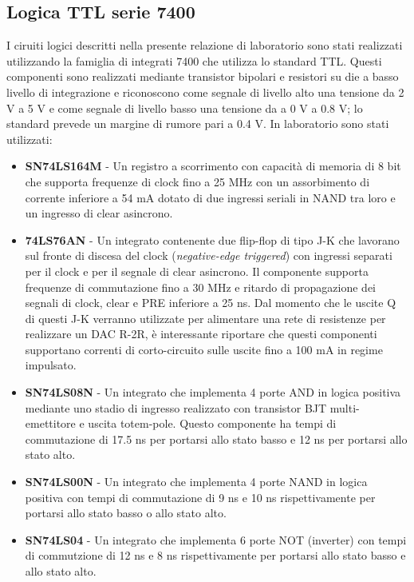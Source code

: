 \documentclass[journal]{IEEEtran}
\begin{document}
\subsection{Logica TTL serie 7400}
I ciruiti logici descritti nella presente relazione di laboratorio sono stati realizzati utilizzando la famiglia di integrati 7400 che utilizza lo standard TTL. Questi componenti sono realizzati mediante transistor bipolari e resistori su die a basso livello di integrazione e riconoscono come segnale di livello alto una tensione da 2 V a 5 V e come segnale di livello basso una tensione da a 0 V a 0.8 V; lo standard prevede un margine di rumore pari a 0.4 V. In laboratorio sono stati utilizzati:
\begin{itemize}
    \item \textbf{SN74LS164M} - Un registro a scorrimento con capacità di memoria di 8 bit che supporta frequenze di clock fino a 25 MHz con un assorbimento di corrente inferiore a 54 mA dotato di due ingressi seriali in NAND tra loro e un ingresso di clear asincrono. 
    
   \cite{D}
    
    \item \textbf{74LS76AN} - Un integrato contenente due flip-flop di tipo J-K che lavorano sul fronte di discesa del clock (\textit{negative-edge triggered}) con ingressi separati per il clock e per il segnale di clear asincrono. Il componente supporta frequenze di commutazione fino a 30 MHz e ritardo di propagazione dei segnali di clock, clear e PRE inferiore a 25 ns. Dal momento che le uscite Q di questi J-K verranno utilizzate per alimentare una rete di resistenze per realizzare un DAC R-2R, è interessante riportare che questi componenti supportano correnti di corto-circuito sulle uscite fino a 100 mA in regime impulsato.
    \cite{E}
    
    \item \textbf{SN74LS08N} - Un integrato che implementa 4 porte AND in logica positiva mediante uno stadio di ingresso realizzato con transistor BJT multi-emettitore e uscita totem-pole. Questo componente ha tempi di commutazione  di 17.5 ns per portarsi allo stato basso e 12 ns per portarsi allo stato alto.
    \cite{F}
    
    \item \textbf{SN74LS00N} - Un integrato che implementa 4 porte NAND in logica positiva con tempi di commutazione di 9 ns e 10 ns rispettivamente per portarsi allo stato basso o allo stato alto.
    \cite{G}
    
    \item \textbf{SN74LS04} - Un integrato che implementa 6 porte NOT (inverter) con tempi di commutzione di 12 ns e 8 ns rispettivamente per portarsi allo stato basso e allo stato alto.
    \cite{H}
    
\end{itemize}
\end{document}
